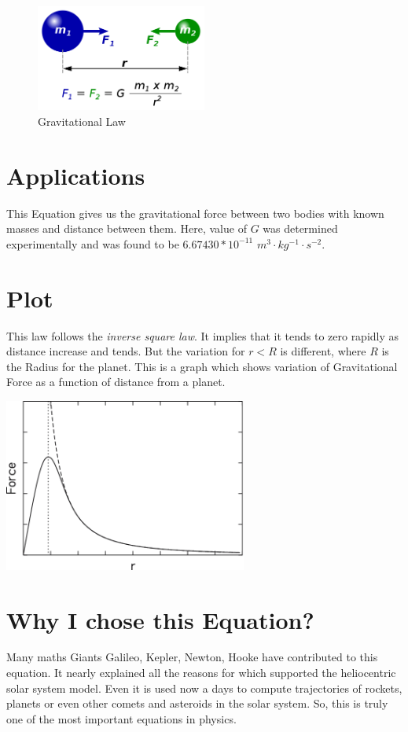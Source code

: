 \documentclass{article}
\begin{document}
\begin{figure}
  \centering
  \includegraphics[width=0.5\textwidth]{Newtons law image.png}
  \caption{Gravitational Law}
  \label{fig:image}
\end{figure}


\section{Applications}
This Equation gives us the gravitational force between two bodies with known masses and distance between them. Here, value of \(G\) was determined experimentally and was found to be \(6.67430 * 10^{-11}\) \(m^{3} \cdot kg^{-1} \cdot s^{-2}\). 

\section{Plot}
This law follows the \emph{inverse square law}. It implies that it tends to zero rapidly as distance increase and tends. But the variation for \(r<R\) is different, where \(R\) is the Radius for the planet. This is a graph which shows variation of Gravitational Force as a function of distance from a planet.

\begin{center}
    \includegraphics[width=0.6\textwidth]{newtons law graph.png}
\end{center}

\section{Why I chose this Equation?}
Many maths Giants Galileo, Kepler, Newton, Hooke have contributed to this equation. It nearly explained all the reasons for which supported the heliocentric solar system model. Even it is used now a days to compute trajectories of rockets, planets or even other comets and asteroids in the solar system. So, this is truly one of the most important equations in physics. 
\newpage
\printbibliography
\end{document}
